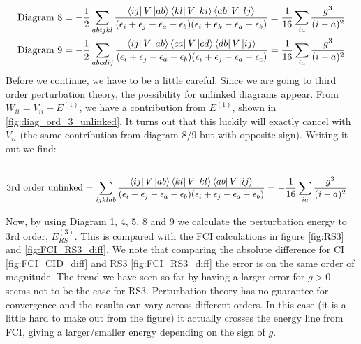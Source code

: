 \documentclass{article}
\newcommand{\inner}[3]{\bra{#1}#2\ket{#3}}
\newcommand{\ord}[2]{#1^{(#2)}}
\begin{document}
    \begin{align*}
        \text{Diagram 8} &= -\frac{1}{2}\sum_{abijkl} \frac{\inner{ij}{V}{ab}\inner{kl}{V}{ki}\inner{ab}{V}{lj}}{(\epsilon_i + \epsilon_j - \epsilon_a - \epsilon_b)(\epsilon_i + \epsilon_k - \epsilon_a - \epsilon_b)} = \frac{1}{16} \sum_{ia} \frac{g^3}{(i-a)^2} \\
        \text{Diagram 9} &= -\frac{1}{2} \sum_{abcdij} \frac{\inner{ij}{V}{ab}\inner{ca}{V}{cd}\inner{db}{V}{ij}}{(\epsilon_i + \epsilon_j - \epsilon_a - \epsilon_b)(\epsilon_i + \epsilon_j - \epsilon_a - \epsilon_c)} = \frac{1}{16}\sum_{ia} \frac{g^3}{(i-a)^2}
    \end{align*}
    Before we continue, we have to be a little careful. Since we are going to third order perturbation theory, the possibility for unlinked diagrams appear. From $W_{ii} = V_{ii} - \ord{E}{1}$, we have a contribution from $\ord{E}{1}$, shown in \cref{fig:diag_ord_3_unlinked}. It turns out that this luckily will exactly cancel with $V_{ii}$ (the same contribution from diagram 8/9 but with opposite sign). Writing it out we find:
    \begin{align}
         \\
        \text{3rd order unlinked} &= \sum_{ijklab} \frac{\inner{ij}{V}{ab}\inner{kl}{V}{kl}\inner{ab}{V}{ij}}{(\epsilon_i + \epsilon_j - \epsilon_a - \epsilon_b)(\epsilon_i + \epsilon_j - \epsilon_a - \epsilon_b)} = -\frac{1}{16} \sum_{ia} \frac{g^3}{(i-a)^2}   
    \end{align}

    Now, by using Diagram 1, 4, 5, 8 and 9 we calculate the perturbation energy to 3rd order, $\ord{E}{3}_{RS}$. This is compared with the FCI calculations in figure \cref{fig:RS3} and \cref{fig:FCI_RS3_diff}. We note that comparing the absolute difference for CI \cref{fig:FCI_CID_diff} and RS3 \cref{fig:FCI_RS3_diff} the error is on the same order of magnitude. The trend we have seen so far by having a larger error for $g > 0$ seems not to be the case for RS3. Perturbation theory has no guarantee for convergence and the results can vary across different orders. In this case (it is a little hard to make out from the figure) it actually crosses the energy line from FCI, giving a larger/smaller energy depending on the sign of $g$. 
\end{document}
